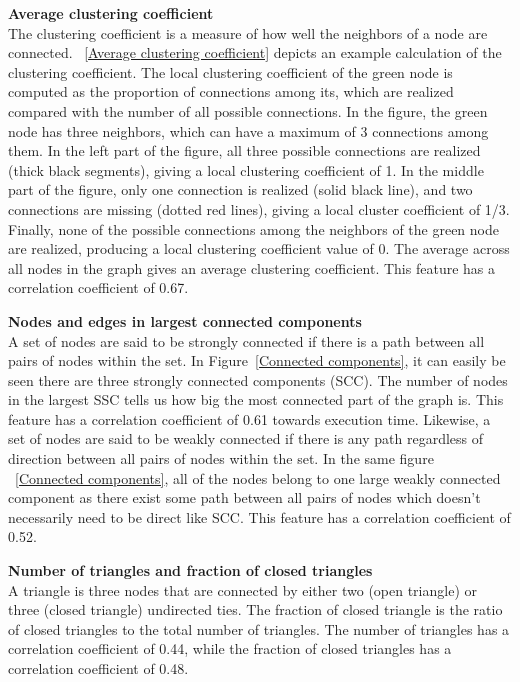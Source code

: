 \textbf{Average clustering coefficient}\\
The clustering coefficient is a measure of how well the neighbors of a node are connected. ~\ref{Average clustering coefficient}  depicts an example calculation of the clustering coefficient. The local clustering coefficient of the green node is computed as the proportion of connections among its, which are realized compared with the number of all possible connections. In the figure, the green node has three neighbors, which can have a maximum of 3 connections among them. In the left part of the figure, all three possible connections are realized (thick black segments), giving a local clustering coefficient of 1. In the middle part of the figure, only one connection is realized (solid black line), and two connections are missing (dotted red lines), giving a local cluster coefficient of 1/3. Finally, none of the possible connections among the neighbors of the green node are realized, producing a local clustering coefficient value of 0. The average across all nodes in the graph gives an average clustering coefficient.  This feature has a correlation coefficient of 0.67.

\textbf{Nodes and edges in largest connected components}\\
A set of nodes are said to be strongly connected if there is a path between all pairs of nodes within the set. In Figure~\ref{Connected components}, it can easily be seen there are three strongly connected components (SCC). The number of nodes in the largest SSC tells us how big the most connected part of the graph is. This feature has a correlation coefficient of 0.61 towards execution time. Likewise, a set of nodes are said to be weakly connected if there is any path regardless of direction between all pairs of nodes within the set. In the same figure ~\ref{Connected components}, all of the nodes belong to one large weakly connected component as there exist some path between all pairs of nodes which doesn't necessarily need to be direct like SCC. This feature has a correlation coefficient of 0.52.

\textbf{Number of triangles and fraction of closed triangles}\\
A triangle is three nodes that are connected by either two (open triangle) or three (closed triangle) undirected ties. The fraction of closed triangle is the ratio of closed triangles to the total number of triangles. The number of triangles has a correlation coefficient of 0.44, while the fraction of closed triangles has a correlation coefficient of 0.48. \\

